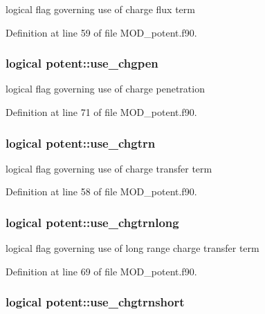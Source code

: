 logical flag governing use of charge flux term 



Definition at line 59 of file M\-O\-D\-\_\-potent.\-f90.

\hypertarget{classpotent_a32e153c24445f68492ea39778aa11b25}{
\subsubsection[{use\-\_\-chgpen}]{\setlength{\rightskip}{0pt plus 5cm}logical potent\-::use\-\_\-chgpen}}\label{classpotent_a32e153c24445f68492ea39778aa11b25}


logical flag governing use of charge penetration 



Definition at line 71 of file M\-O\-D\-\_\-potent.\-f90.

\hypertarget{classpotent_a427a66d48203d10bc98f3975007b9a49}{
\subsubsection[{use\-\_\-chgtrn}]{\setlength{\rightskip}{0pt plus 5cm}logical potent\-::use\-\_\-chgtrn}}\label{classpotent_a427a66d48203d10bc98f3975007b9a49}


logical flag governing use of charge transfer term 



Definition at line 58 of file M\-O\-D\-\_\-potent.\-f90.

\hypertarget{classpotent_a40eee4d6a2e9b4621245a29d4d0e073b}{
\subsubsection[{use\-\_\-chgtrnlong}]{\setlength{\rightskip}{0pt plus 5cm}logical potent\-::use\-\_\-chgtrnlong}}\label{classpotent_a40eee4d6a2e9b4621245a29d4d0e073b}


logical flag governing use of long range charge transfer term 



Definition at line 69 of file M\-O\-D\-\_\-potent.\-f90.

\hypertarget{classpotent_a8f475cebafbcffbafc52b364968fca6e}{
\subsubsection[{use\-\_\-chgtrnshort}]{\setlength{\rightskip}{0pt plus 5cm}logical potent\-::use\-\_\-chgtrnshort}}\label{classpotent_a8f475cebafbcffbafc52b364968fca6e}


